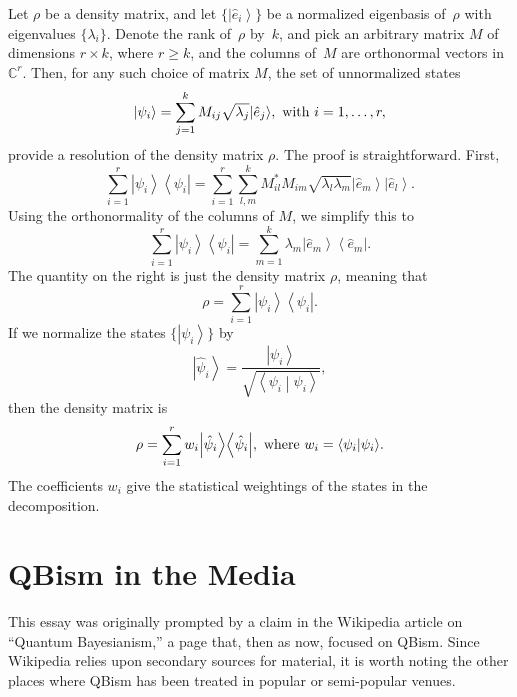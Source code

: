 \documentclass[aps,pra,superscriptaddress,12pt,tightenlines,nofootinbib]{revtex4-2}
\newcommand{\ket}[1]{{\ensuremath{\left| #1 \right\rangle}}}
\newcommand{\bra}[1]{{\ensuremath{\left\langle #1 \right|}}}
\newcommand{\braket}[2]{{\ensuremath{\left\langle #1 \middle| #2
      \right\rangle}}}
\begin{document}
Let $\rho$ be a density matrix, and let $\{\ket{\hat{e}_i}\}$ be a
normalized eigenbasis of~$\rho$ with eigenvalues $\{\lambda_i\}$.
Denote the rank of~$\rho$ by~$k$, and pick an arbitrary matrix $M$ of
dimensions $r \times k$, where $r \geq k$, and the columns of~$M$ are
orthonormal vectors in~$\mathbb{C}^r$.  Then, for any such choice of
matrix $M$, the set of unnormalized states
\begin{equation}
\ket{\psi_i} = \sum_{j=1}^k M_{ij} \sqrt{\lambda_j} \ket{\hat{e}_j},
\hbox{ with } i = 1,\ldots,r,
\end{equation}
provide a resolution of the density matrix $\rho$.  The proof is
straightforward.  First,
\begin{equation}
\sum_{i=1}^r \ket{\psi_i}\bra{\psi_i}
 = \sum_{i=1}^r \sum_{l,m}^k M_{il}^* M_{im} \sqrt{\lambda_l\lambda_m}
   \ket{\hat{e}_m}\ket{\hat{e}_l}.
\end{equation}
Using the orthonormality of the columns of $M$, we simplify this to
\begin{equation}
\sum_{i=1}^r \ket{\psi_i}\bra{\psi_i}
 = \sum_{m=1}^k \lambda_m \ket{\hat{e}_m}\bra{\hat{e}_m}.
\end{equation}
The quantity on the right is just the density matrix $\rho$, meaning
that
\begin{equation}
\rho = \sum_{i=1}^r \ket{\psi_i}\bra{\psi_i}.
\end{equation}
If we normalize the states $\{\ket{\psi_i}\}$ by
\begin{equation}
\ket{\hat{\psi}_i} =
 \frac{\ket{\psi_i}}{\sqrt{\braket{\psi_i}{\psi_i}}},
\end{equation}
then the density matrix is
\begin{equation}
\rho = \sum_{i=1}^r w_i \ket{\hat{\psi}_i}\bra{\hat{\psi}_i},
\hbox{ where } w_i = \braket{\psi_i}{\psi_i}.
\end{equation}
The coefficients $w_i$ give the statistical weightings of the states
in the decomposition.

\section{QBism in the Media}

This essay was originally prompted by a claim in the Wikipedia article
on ``Quantum Bayesianism,'' a page that, then as now, focused on
QBism.  Since Wikipedia relies upon secondary sources for material, it
is worth noting the other places where QBism has been treated in
popular or semi-popular venues.
\end{document}

